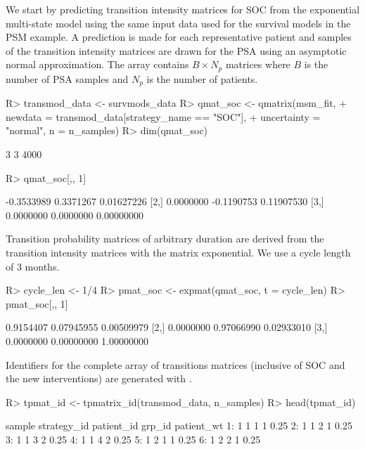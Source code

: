 \documentclass[article, nojss]{jss}\usepackage[]{graphicx}\usepackage[]{color}
\begin{document}
We start by predicting transition intensity matrices for SOC from the exponential multi-state model using the same input data used for the survival models in the PSM example. A prediction is made for each representative patient and samples of the transition intensity matrices are drawn for the PSA using an asymptotic normal approximation. The array contains $B \times N_p$ matrices where $B$ is the number of PSA samples and $N_p$ is the number of patients. 

\begin{Schunk}
\begin{Sinput}
R> transmod_data <- survmods_data
R> qmat_soc <- qmatrix(msm_fit, 
+    newdata = transmod_data[strategy_name == "SOC"], 
+    uncertainty = "normal", n = n_samples)
R> dim(qmat_soc)
\end{Sinput}
\begin{Soutput}
[1]    3    3 4000
\end{Soutput}
\begin{Sinput}
R> qmat_soc[,, 1]
\end{Sinput}
\begin{Soutput}
           [,1]       [,2]       [,3]
[1,] -0.3533989  0.3371267 0.01627226
[2,]  0.0000000 -0.1190753 0.11907530
[3,]  0.0000000  0.0000000 0.00000000
\end{Soutput}
\end{Schunk}

Transition probability matrices of arbitrary duration are derived from the transition intensity matrices with the matrix exponential. We use a cycle length of 3 months.

\begin{Schunk}
\begin{Sinput}
R> cycle_len <- 1/4
R> pmat_soc <- expmat(qmat_soc, t = cycle_len)
R> pmat_soc[,, 1]
\end{Sinput}
\begin{Soutput}
          [,1]       [,2]       [,3]
[1,] 0.9154407 0.07945955 0.00509979
[2,] 0.0000000 0.97066990 0.02933010
[3,] 0.0000000 0.00000000 1.00000000
\end{Soutput}
\end{Schunk}

Identifiers for the complete array of transitions matrices (inclusive of SOC and the new interventions) are generated with .

\begin{Schunk}
\begin{Sinput}
R> tpmat_id <- tpmatrix_id(transmod_data, n_samples)
R> head(tpmat_id)
\end{Sinput}
\begin{Soutput}
   sample strategy_id patient_id grp_id patient_wt
1:      1           1          1      1       0.25
2:      1           1          2      1       0.25
3:      1           1          3      2       0.25
4:      1           1          4      2       0.25
5:      1           2          1      1       0.25
6:      1           2          2      1       0.25
\end{Soutput}
\end{Schunk}
\end{document}
